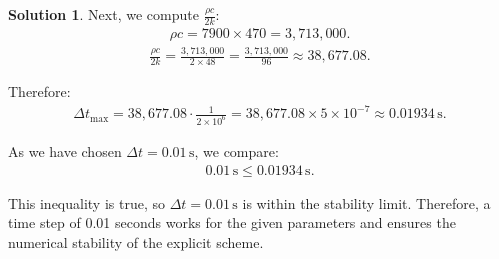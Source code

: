 \documentclass[12pt]{article}
\theoremstyle{definition} %
\newtheorem{solution}{Solution}
\theoremstyle{plain} %
\begin{document}
\begin{solution}
             Next, we compute $\frac{\rho c}{2k}$:
            \begin{align}
            \rho c = 7900 \times 470 = 3{,}713{,}000.
            \end{align}
            \begin{align}
            \frac{\rho c}{2k} = \frac{3{,}713{,}000}{2 \times 48} = \frac{3{,}713{,}000}{96} \approx 38{,}677.08.
            \end{align}
            
             Therefore:
            \begin{align}
            \Delta t_{\max} = 38{,}677.08 \cdot \frac{1}{2 \times 10^6} = 38{,}677.08 \times 5 \times 10^{-7} \approx 0.01934\,\text{s}.
            \end{align}
            
             As we have chosen $\Delta t = 0.01\,\text{s}$, we compare:
            \begin{align}
            0.01\,\text{s} \leq 0.01934\,\text{s}.
            \end{align}
            
             This inequality is true, so $\Delta t = 0.01\,\text{s}$ is within the stability limit. Therefore, a time step of 0.01 seconds works for the given parameters and ensures the numerical stability of the explicit scheme.
        
        
        \begin{enumerate}
            


\end{enumerate}
\end{solution}
\end{document}
